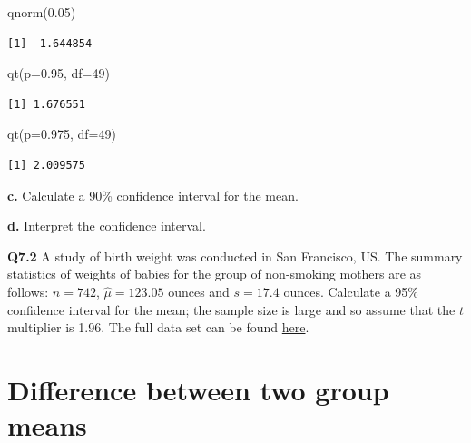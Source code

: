 \documentclass[
  oneside]{krantz}
\newenvironment{Shaded}{\begin{snugshade}}{\end{snugshade}}
\newcommand{\AttributeTok}[1]{\textcolor[rgb]{0.77,0.63,0.00}{#1}}
\newcommand{\DecValTok}[1]{\textcolor[rgb]{0.00,0.00,0.81}{#1}}
\newcommand{\FloatTok}[1]{\textcolor[rgb]{0.00,0.00,0.81}{#1}}
\newcommand{\FunctionTok}[1]{\textcolor[rgb]{0.00,0.00,0.00}{#1}}
\newcommand{\NormalTok}[1]{#1}
\begin{document}
\begin{Shaded}
\begin{Highlighting}[]
\FunctionTok{qnorm}\NormalTok{(}\FloatTok{0.05}\NormalTok{)}
\end{Highlighting}
\end{Shaded}

\begin{verbatim}
[1] -1.644854
\end{verbatim}

\begin{Shaded}
\begin{Highlighting}[]
\FunctionTok{qt}\NormalTok{(}\AttributeTok{p=}\FloatTok{0.95}\NormalTok{, }\AttributeTok{df=}\DecValTok{49}\NormalTok{)}
\end{Highlighting}
\end{Shaded}

\begin{verbatim}
[1] 1.676551
\end{verbatim}

\begin{Shaded}
\begin{Highlighting}[]
\FunctionTok{qt}\NormalTok{(}\AttributeTok{p=}\FloatTok{0.975}\NormalTok{, }\AttributeTok{df=}\DecValTok{49}\NormalTok{)}
\end{Highlighting}
\end{Shaded}

\begin{verbatim}
[1] 2.009575
\end{verbatim}

\textbf{c.} Calculate a 90\% confidence interval for the mean.

\textbf{d.} Interpret the confidence interval.

\textbf{Q7.2} A study of birth weight was conducted in San Francisco, US. The summary statistics of weights of babies for the group of non-smoking mothers are as follows: \(n=742\), \(\hat \mu = 123.05\) ounces and \(s = 17.4\) ounces. Calculate a 95\% confidence interval for the mean; the sample size is large and so assume that the \(t\) multiplier is 1.96. The full data set can be found \href{https://www.stat.berkeley.edu/users/statlabs/labs.html}{here}.

\hypertarget{difference-between-two-group-means}{%
\section{Difference between two group means}\label{difference-between-two-group-means}}
\end{document}
